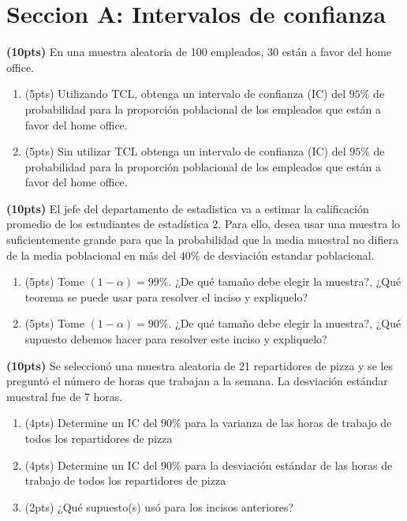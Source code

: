\documentclass[addpoints]{exam}
\theoremstyle{mytheor}
\begin{document}
\section*{Seccion A: Intervalos de confianza }
\begin{questions} 

\question \textbf{(10pts)} En una muestra aleatoria de 100 empleados, 30 están a favor del home office. 
\begin{enumerate}[label=\Alph*)]
\item (5pts) Utilizando TCL, obtenga un intervalo de confianza (IC) del $95\%$ de probabilidad para la proporción poblacional de los empleados que están a favor del home office. 
\item (5pts) Sin utilizar TCL obtenga un intervalo de confianza (IC) del $95\%$ de probabilidad para la proporción poblacional de los empleados que están a favor del home office. 
\end{enumerate}

\question \textbf{(10pts)} El jefe del departamento de estadistica va a estimar la calificación promedio de los estudiantes de estadística 2. Para ello, desea usar una muestra lo suficientemente grande para que la probabilidad que la media muestral no difiera de la media poblacional en más del $40\%$ de desviación estandar poblacional. 
\begin{enumerate}[label=\Alph*)]
\item (5pts) Tome $(1-\alpha)= 99\%$. ¿De qué tamaño debe elegir la muestra?, ¿Qué teorema se puede usar para resolver el inciso y expliquelo?
\item (5pts) Tome $(1-\alpha)= 90\%$. ¿De qué tamaño debe elegir la muestra?, ¿Qué supuesto debemos hacer para resolver este inciso y expliquelo?
\end{enumerate}

\question \textbf{(10pts)} Se seleccionó una muestra aleatoria de 21 repartidores de pizza y se les preguntó el número de horas que trabajan a la semana. La desviación estándar muestral fue de 7 horas. 
\begin{enumerate}[label=\Alph*)]
\item (4pts) Determine un IC del $90\%$ para la varianza de las horas de trabajo de todos los repartidores de pizza
\item (4pts) Determine un IC del $90\%$ para la desviación estándar de las horas de trabajo de todos los repartidores de pizza
\item (2pts) ¿Qué supuesto(s) usó para los incisos anteriores?
\end{enumerate}


\end{questions}
\end{document}
